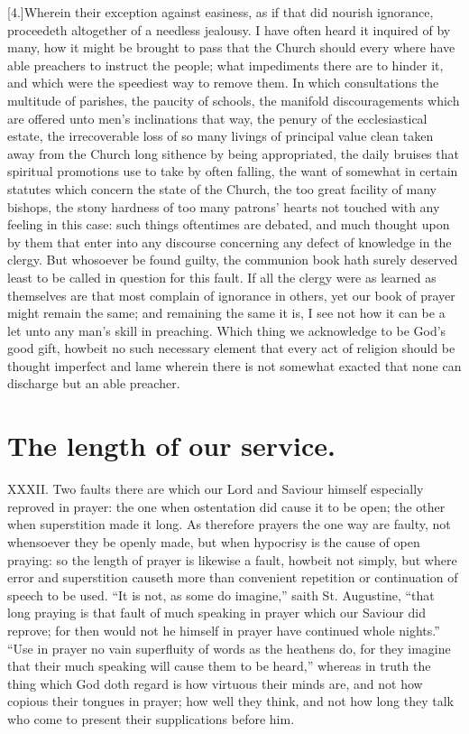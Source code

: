 [4.]Wherein their exception against easiness, as if that did nourish ignorance, proceedeth altogether of a needless jealousy. I have often heard it inquired of by many, how it might be brought to pass that the Church should every where have able preachers to instruct the people; what impediments there are to hinder it, and which were the speediest way to remove them. In which consultations the multitude of parishes, the paucity of schools, the manifold discouragements which are offered unto men’s inclinations that way, the penury of the ecclesiastical estate, the irrecoverable loss of so many livings of principal value clean taken away from the Church long sithence by being appropriated, the daily bruises that spiritual promotions use to take by often falling, the want of somewhat in certain statutes which concern the state of the Church, the too great facility of many bishops, the stony hardness of too many patrons’ hearts not touched with any feeling in this case: such things oftentimes are debated, and much thought upon by them that enter into any discourse concerning any defect of knowledge in the clergy. But whosoever be found guilty, the communion book hath surely deserved least to be called in question for this fault. If all the clergy were as learned as themselves are that most complain of ignorance in others, yet our book of prayer might remain the same; and remaining the same it is, I see not how it can be a let unto any man’s skill in preaching. Which thing we acknowledge to be God’s good gift, howbeit no such necessary element that every act of religion should be thought imperfect and lame wherein there is not somewhat exacted that none can discharge but an able preacher.


\section*{The length of our service.}
XXXII. Two faults there are which our Lord and Saviour himself especially reproved in prayer: the one when ostentation did cause it to be open; the other when superstition  made it long. As therefore prayers the one way are faulty, not whensoever they be openly made,
 but when hypocrisy is the cause of open praying: so the length of prayer is likewise a fault, howbeit not simply, but where error and superstition causeth more than convenient repetition or continuation of speech to be used. “It is not, as some do imagine,” saith St. Augustine, “that long praying is that fault of much speaking in prayer which our Saviour did reprove; for then would not he himself in prayer have continued whole nights.” “Use in prayer no vain superfluity of words as the heathens do, for they imagine that their much speaking will cause them to be heard,” whereas in truth the thing which God doth regard is how virtuous their minds are, and not how copious their tongues in prayer; how well they think, and not how long they talk who come to present their supplications before him.

